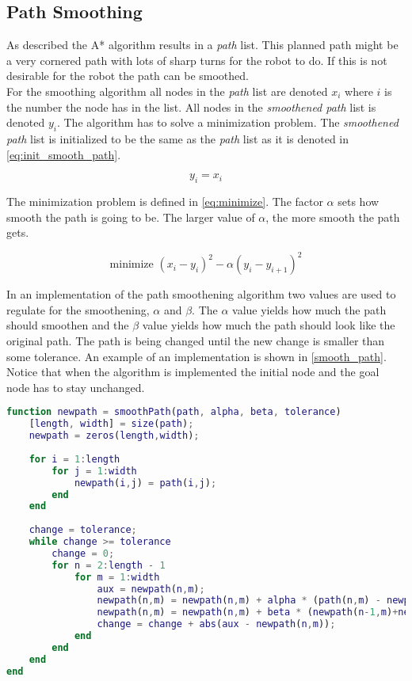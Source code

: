 \subsection{Path Smoothing} %
\label{sub:path_smoothing}

As described the A* algorithm results in a \emph{path} list. This planned path might be a very cornered path with lots of sharp turns for the robot to do. If this is not desirable for the robot the path can be smoothed. \\

For the smoothing algorithm all nodes in the \emph{path} list are denoted $x_i$ where $i$ is the number the node has in the list. All nodes in the \emph{smoothened path} list is denoted $y_i$. The algorithm has to solve a minimization problem. The \emph{smoothened path} list is initialized to be the same as the \emph{path} list as it is denoted in \autoref{eq:init_smooth_path}.

\begin{equation}
\label{eq:init_smooth_path}
y_i = x_i
\end{equation}

The minimization problem is defined in \autoref{eq:minimize}. The factor $\alpha$ sets how smooth the path is going to be. The larger value of $\alpha$, the more smooth the path gets. 

\begin{equation}
\label{eq:minimize}
\text{minimize\ } (x_i - y_i)^2 - \alpha (y_i - y_{i+1})^2
\end{equation}

In an implementation of the path smoothening algorithm two values are used to regulate for the smoothening, $\alpha$ and $\beta$. The $\alpha$ value yields how much the path should smoothen and the $\beta$ value yields how much the path should look like the original path. The path is being changed until the new change is smaller than some tolerance. An example of an implementation is shown in \autoref{smooth_path}. Notice that when the algorithm is implemented the initial node and the goal node has to stay unchanged.

\begin{lstlisting}[caption=Implementation example of path smoothing., label=smooth_path, language=Matlab]
function newpath = smoothPath(path, alpha, beta, tolerance)
    [length, width] = size(path);
    newpath = zeros(length,width);
    
    for i = 1:length
        for j = 1:width
            newpath(i,j) = path(i,j);
        end
    end
    
    change = tolerance;
    while change >= tolerance
        change = 0;
        for n = 2:length - 1
            for m = 1:width
                aux = newpath(n,m);
                newpath(n,m) = newpath(n,m) + alpha * (path(n,m) - newpath(n,m));
                newpath(n,m) = newpath(n,m) + beta * (newpath(n-1,m)+newpath(n+1,m)-2*newpath(n,m));
                change = change + abs(aux - newpath(n,m));
            end
        end
    end
end
\end{lstlisting}

